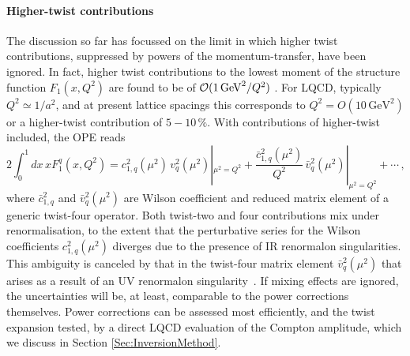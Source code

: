 \paragraph*{Higher-twist contributions} The discussion so far has focussed on the limit in which higher twist contributions, suppressed by powers of the momentum-transfer, have been ignored. In fact, higher twist contributions to the lowest moment of the structure function $F_1(x,Q^2)$ are found to be of ${\cal O}(1\, \mbox{GeV}^2/Q^2)$ \cite{Blumlein:2008kz}. For LQCD, typically $Q^2 \simeq 1/a^2$, and at present lattice spacings this corresponds to $Q^2 = O(10\,\mbox{GeV}^2)$ or a higher-twist contribution of $5 - 10\, \%$. With contributions of higher-twist included, the OPE reads
\begin{equation}
2 \int_0^1 dx\, x F_1^q(x,Q^2) = c_{1,q}^2(\mu^2)\, v_q^2(\mu^2)|_{\mu^2=Q^2} + \frac{\bar{c}_{1,q}^2(\mu^2)}{Q^2}\, \bar{v}_q^2(\mu^2)|_{\mu^2=Q^2} + \cdots \,,
\label{tex}
\end{equation}
where $\bar{c}_{1,q}^2$ and $\bar{v}_q^2(\mu^2)$ are Wilson coefficient and reduced matrix element of a generic twist-four operator. Both twist-two and four contributions mix under renormalisation, to the extent that the perturbative series for the Wilson coefficients $c_{1,q}^2(\mu^2)$ diverges due to the presence of IR renormalon singularities. This ambiguity is canceled by that in the twist-four matrix element $\bar{v}_q^2(\mu^2)$ that arises as a result of an UV renormalon singularity~\cite{Martinelli:1996pk}. If mixing effects are ignored, the uncertainties will be, at least, comparable to the power corrections themselves. Power corrections can be assessed most efficiently, and the twist expansion tested, by a direct LQCD evaluation of the Compton amplitude, which we discuss in Section \ref{Sec:InversionMethod}.

